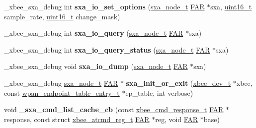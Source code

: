 \begin{DoxyCompactItemize}
\+\_\+xbee\+\_\+sxa\+\_\+debug int {\bfseries sxa\+\_\+io\+\_\+set\+\_\+options} (\hyperlink{structsxa__node__t}{sxa\+\_\+node\+\_\+t} \hyperlink{group__hal_gaef060b3456fdcc093a7210a762d5f2ed}{F\+AR} $\ast$sxa, \hyperlink{group__hal__dos_ga5a8b2dc9e45a9ee81a94ef304fb62505}{uint16\+\_\+t} sample\+\_\+rate, \hyperlink{group__hal__dos_ga5a8b2dc9e45a9ee81a94ef304fb62505}{uint16\+\_\+t} change\+\_\+mask)
\item 
\mbox{\label{group___s_x_a_ga652e37d2a3e16d2723e68ad4488d8cce}} 
\+\_\+xbee\+\_\+sxa\+\_\+debug int {\bfseries sxa\+\_\+io\+\_\+query} (\hyperlink{structsxa__node__t}{sxa\+\_\+node\+\_\+t} \hyperlink{group__hal_gaef060b3456fdcc093a7210a762d5f2ed}{F\+AR} $\ast$sxa)
\item 
\mbox{\label{group___s_x_a_ga47f2a1443c29bcbd290292ec33574403}} 
\+\_\+xbee\+\_\+sxa\+\_\+debug int {\bfseries sxa\+\_\+io\+\_\+query\+\_\+status} (\hyperlink{structsxa__node__t}{sxa\+\_\+node\+\_\+t} \hyperlink{group__hal_gaef060b3456fdcc093a7210a762d5f2ed}{F\+AR} $\ast$sxa)
\item 
\mbox{\label{group___s_x_a_ga698650d3afb6074ef65c9bccf846f471}} 
\+\_\+xbee\+\_\+sxa\+\_\+debug void {\bfseries sxa\+\_\+io\+\_\+dump} (\hyperlink{structsxa__node__t}{sxa\+\_\+node\+\_\+t} \hyperlink{group__hal_gaef060b3456fdcc093a7210a762d5f2ed}{F\+AR} $\ast$sxa)
\item 
\mbox{\label{group___s_x_a_ga20be2a68c0403ec05230526554ffc1ae}} 
\+\_\+xbee\+\_\+sxa\+\_\+debug \hyperlink{structsxa__node__t}{sxa\+\_\+node\+\_\+t} \hyperlink{group__hal_gaef060b3456fdcc093a7210a762d5f2ed}{F\+AR} $\ast$ {\bfseries sxa\+\_\+init\+\_\+or\+\_\+exit} (\hyperlink{structxbee__dev__t}{xbee\+\_\+dev\+\_\+t} $\ast$xbee, const \hyperlink{structwpan__endpoint__table__entry__t}{wpan\+\_\+endpoint\+\_\+table\+\_\+entry\+\_\+t} $\ast$ep\+\_\+table, int verbose)
\item 
\mbox{\label{group___s_x_a_ga7b3fb6046bd92a9d898403451f524737}} 
void {\bfseries \+\_\+sxa\+\_\+cmd\+\_\+list\+\_\+cache\+\_\+cb} (const \hyperlink{structxbee__cmd__response__t}{xbee\+\_\+cmd\+\_\+response\+\_\+t} \hyperlink{group__hal_gaef060b3456fdcc093a7210a762d5f2ed}{F\+AR} $\ast$response, const struct \hyperlink{structxbee__atcmd__reg__t}{xbee\+\_\+atcmd\+\_\+reg\+\_\+t} \hyperlink{group__hal_gaef060b3456fdcc093a7210a762d5f2ed}{F\+AR} $\ast$reg, void \hyperlink{group__hal_gaef060b3456fdcc093a7210a762d5f2ed}{F\+AR} $\ast$base)

\end{DoxyCompactItemize}
